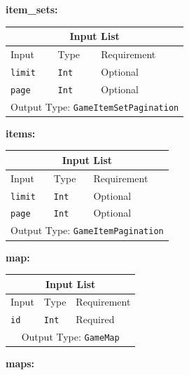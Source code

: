 \documentclass[10pt, a4paper]{memoir}
\numberwithin{equation}{section}
\theoremstyle{plain}
\theoremstyle{defp}
\theoremstyle{dotless}
\theoremstyle{definition}
\theoremstyle{dotless}
\theoremstyle{dotless}
\theoremstyle{defp}
\theoremstyle{defp}
\theoremstyle{be}          %
\theoremstyle{defp}
\newcommand\ttt[1]{\texttt{#1}}
\begin{document}
\medskip

\textbf{item\_sets:}

\begin{table}[h!]
	\centering
	\begin{tabular}{ |p{4.2cm}|p{6cm}|p{3cm}|  }
		\hline
		\multicolumn{3}{|c|}{Input List} \\
		\hline
		Input & Type & Requirement\\
		\hline
		\ttt{limit} & \ttt{Int} & Optional\\
		\ttt{page} & \ttt{Int} & Optional\\
		\hline
		\multicolumn{3}{|c|}{Output Type: \ttt{GameItemSetPagination}} \\
		\hline
	\end{tabular}
\end{table}

\newpage

\textbf{items:}

\begin{table}[h!]
	\centering
	\begin{tabular}{ |p{4.2cm}|p{6cm}|p{3cm}|  }
		\hline
		\multicolumn{3}{|c|}{Input List} \\
		\hline
		Input & Type & Requirement\\
		\hline
		\ttt{limit} & \ttt{Int} & Optional\\
		\ttt{page} & \ttt{Int} & Optional\\
		\hline
		\multicolumn{3}{|c|}{Output Type: \ttt{GameItemPagination}} \\
		\hline
	\end{tabular}
\end{table}

\medskip

\textbf{map:}

\begin{table}[h!]
	\centering
	\begin{tabular}{ |p{4.2cm}|p{6cm}|p{3cm}|  }
		\hline
		\multicolumn{3}{|c|}{Input List} \\
		\hline
		Input & Type & Requirement\\
		\hline
		\ttt{id} & \ttt{Int} & Required\\
		\hline
		\multicolumn{3}{|c|}{Output Type: \ttt{GameMap}} \\
		\hline
	\end{tabular}
\end{table}

\medskip

\textbf{maps:}
\end{document}
